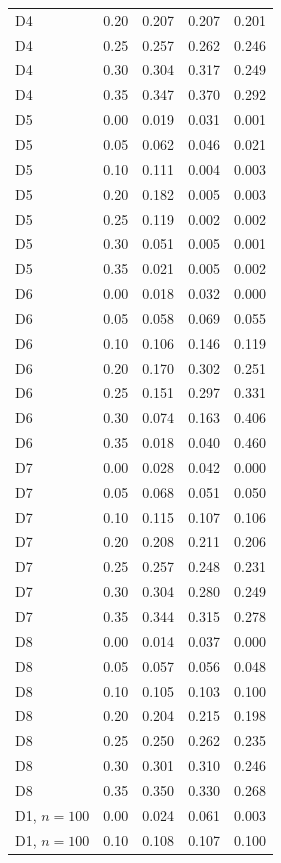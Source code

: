 {\begin{longtable}{llccc}
D4 & 0.20 & 0.207 & 0.207 & 0.201 \\
D4 & 0.25 & 0.257 & 0.262 & 0.246 \\
D4 & 0.30 & 0.304 & 0.317 & 0.249 \\
D4 & 0.35 & 0.347 & 0.370 & 0.292 \\
D5 & 0.00 & 0.019 & 0.031 & 0.001 \\
D5 & 0.05 & 0.062 & 0.046 & 0.021 \\
D5 & 0.10 & 0.111 & 0.004 & 0.003 \\
D5 & 0.20 & 0.182 & 0.005 & 0.003 \\
D5 & 0.25 & 0.119 & 0.002 & 0.002 \\
D5 & 0.30 & 0.051 & 0.005 & 0.001 \\
D5 & 0.35 & 0.021 & 0.005 & 0.002 \\
D6 & 0.00 & 0.018 & 0.032 & 0.000 \\
D6 & 0.05 & 0.058 & 0.069 & 0.055 \\
D6 & 0.10 & 0.106 & 0.146 & 0.119 \\
D6 & 0.20 & 0.170 & 0.302 & 0.251 \\
D6 & 0.25 & 0.151 & 0.297 & 0.331 \\
D6 & 0.30 & 0.074 & 0.163 & 0.406 \\
D6 & 0.35 & 0.018 & 0.040 & 0.460 \\
D7 & 0.00 & 0.028 & 0.042 & 0.000 \\
D7 & 0.05 & 0.068 & 0.051 & 0.050 \\
D7 & 0.10 & 0.115 & 0.107 & 0.106 \\
D7 & 0.20 & 0.208 & 0.211 & 0.206 \\
D7 & 0.25 & 0.257 & 0.248 & 0.231 \\
D7 & 0.30 & 0.304 & 0.280 & 0.249 \\
D7 & 0.35 & 0.344 & 0.315 & 0.278 \\
D8 & 0.00 & 0.014 & 0.037 & 0.000 \\
D8 & 0.05 & 0.057 & 0.056 & 0.048 \\
D8 & 0.10 & 0.105 & 0.103 & 0.100 \\
D8 & 0.20 & 0.204 & 0.215 & 0.198 \\
D8 & 0.25 & 0.250 & 0.262 & 0.235 \\
D8 & 0.30 & 0.301 & 0.310 & 0.246 \\
D8 & 0.35 & 0.350 & 0.330 & 0.268 \\
D1, $n=100$ & 0.00 & 0.024 & 0.061 & 0.003 \\
D1, $n=100$ & 0.10 & 0.108 & 0.107 & 0.100 \\

\end{longtable}}
